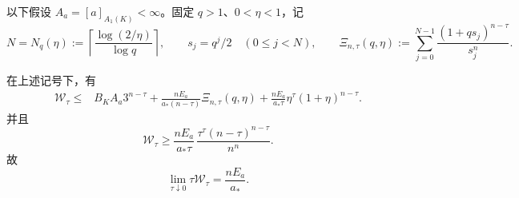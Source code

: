 以下假设 $A_a=[a]_{A_1(K)}<\infty$。固定 $q>1$、$0<\eta<1$，记
\[
N=N_q(\eta):=\left\lceil\frac{\log(2/\eta)}{\log q}\right\rceil,
\qquad s_j=q^j/2\quad(0\le j<N),\qquad
\Xi_{n,\tau}(q,\eta):=\sum_{j=0}^{N-1}\frac{(1+qs_j)^{n-\tau}}{s_j^n}.
\]
\begin{theorem}[三尺度上下界]\label{thm:small-homogeneity-weak}
在上述记号下，有
\begin{align}
\mathcal W_\tau\le{}&B_K A_a3^{n-\tau}
+\frac{nE_a}{a_*(n-\tau)}\Xi_{n,\tau}(q,\eta)
+\frac{nE_a}{a_*\tau}\eta^\tau(1+\eta)^{n-\tau}. \tag{SW.1}\label{eq:sw-upper}
\end{align}
并且
\begin{equation}
\mathcal W_\tau\ge\frac{nE_a}{a_*\tau}\,
\frac{\tau^\tau(n-\tau)^{n-\tau}}{n^n}. \tag{SW.2}\label{eq:sw-lower}
\end{equation}
故
\[\boxed{\displaystyle\lim_{\tau\downarrow0}\tau \mathcal W_\tau=\frac{nE_a}{a_*}.}\tag{SW.3}\label{eq:sw-limit}\]
\end{theorem}

